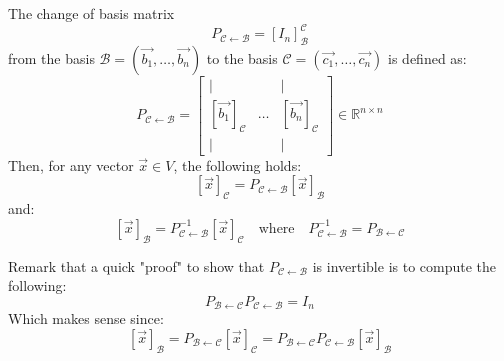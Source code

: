 \begin{theorem}
    The change of basis matrix $$P_{\mathcal{C} \leftarrow \mathcal{B}} = [I_n]^{\mathcal{C}}_{\mathcal{B}}$$ from the basis $\mathcal{B} = (\vec{b_1}, \ldots, \vec{b_n})$ to the basis $\mathcal{C} = (\vec{c_1}, \ldots, \vec{c_n})$ is defined as:
    \[
        P_{\mathcal{C} \leftarrow \mathcal{B}} = \begin{bmatrix}
            | & & | \\
            [\vec{b_1}]_\mathcal{C} & \ldots & [\vec{b_n}]_\mathcal{C} \\
            | & & |
        \end{bmatrix} \in \mathbb{R}^{n \times n}
    \]
    Then, for any vector $\vec{x} \in V$, the following holds:
    \[
        [\vec{x}]_\mathcal{C} = P_{\mathcal{C} \leftarrow \mathcal{B}} [\vec{x}]_\mathcal{B}
    \]
    and:
    \[
        [\vec{x}]_\mathcal{B} = P_{\mathcal{C} \leftarrow \mathcal{B}}^{-1} [\vec{x}]_\mathcal{C} \quad \text{where} \quad P_{\mathcal{C} \leftarrow \mathcal{B}}^{-1} = P_{\mathcal{B} \leftarrow \mathcal{C}}
    \]
\end{theorem}
Remark that a quick "proof" to show that $P_{\mathcal{C} \leftarrow \mathcal{B}}$ is invertible is to compute the following:
\[ P_{\mathcal{B} \leftarrow \mathcal{C}} P_{\mathcal{C} \leftarrow \mathcal{B}} = I_n \]
Which makes sense since:
\[ [\vec{x}]_\mathcal{B} = P_{\mathcal{B} \leftarrow \mathcal{C}} [\vec{x}]_\mathcal{C} = P_{\mathcal{B} \leftarrow \mathcal{C}} P_{\mathcal{C} \leftarrow \mathcal{B}} [\vec{x}]_\mathcal{B} \]

